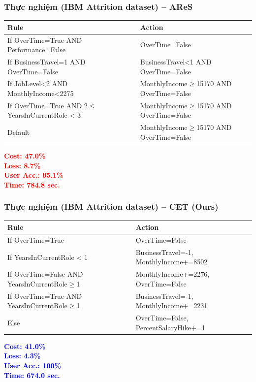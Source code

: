 \documentclass[notheorems, aspectratio=149]{beamer}
\begin{document}
\begin{frame}
    \frametitle{Thực nghiệm (IBM Attrition dataset) – AReS \parencite{rawal2020ares}}

    \scriptsize
    \begin{tabular}{|p{3.5cm}|p{5.5cm}|}
        \hline
        \textbf{Rule} & \textbf{Action} \\
        \hline
        If OverTime=True AND Performance=False & OverTime=False \\
        \hline
        If BusinessTravel=1 AND OverTime=False & BusinessTravel<1 AND OverTime=False \\
        \hline
        If JobLevel<2 AND MonthlyIncome<2275 & MonthlyIncome$\geq$15170 AND OverTime=False \\
        \hline
        If OverTime=True AND $2 \leq$ YearsInCurrentRole < 3 & MonthlyIncome$\geq$15170 AND OverTime=False \\
        \hline
        Default & MonthlyIncome$\geq$15170 AND OverTime=False \\
        \hline
    \end{tabular}

    \vspace{0.5cm}
    \textcolor{red}{\textbf{Cost: 47.0\%}} \\
    \textcolor{red}{\textbf{Loss: 8.7\%}} \\
    \textcolor{red}{\textbf{User Acc.: 95.1\%}} \\
    \textcolor{red}{\textbf{Time: 784.8 sec.}}
\end{frame}

\begin{frame}
    \frametitle{Thực nghiệm (IBM Attrition dataset) – CET (Ours)}

    \scriptsize
    \begin{tabular}{|p{3.5cm}|p{5.5cm}|}
        \hline
        \textbf{Rule} & \textbf{Action} \\
        \hline
        If OverTime=True & OverTime=False \\
        \hline
        If YearsInCurrentRole < 1 & BusinessTravel=-1,\; MonthlyIncome+=8502 \\
        \hline
        If OverTime=False AND YearsInCurrentRole$\geq$1 & MonthlyIncome+=2276,\; OverTime=False \\
        \hline
        If OverTime=True AND YearsInCurrentRole$\geq$1 & BusinessTravel=-1,\; MonthlyIncome+=2231 \\
        \hline
        Else & OverTime=False,\; PercentSalaryHike+=1 \\
        \hline
    \end{tabular}

    \vspace{0.5cm}
    \textcolor{blue}{\textbf{Cost: 41.0\%}} \\
    \textcolor{blue}{\textbf{Loss: 4.3\%}} \\
    \textcolor{blue}{\textbf{User Acc.: 100\%}} \\
    \textcolor{blue}{\textbf{Time: 674.0 sec.}}


\end{frame}
\end{document}
